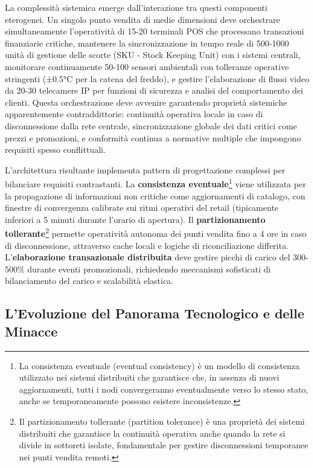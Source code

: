 La complessità sistemica emerge dall'interazione tra questi componenti eterogenei. Un singolo punto vendita di medie dimensioni deve orchestrare simultaneamente l'operatività di 15-20 terminali POS che processano transazioni finanziarie critiche, mantenere la sincronizzazione in tempo reale di 500-1000 unità di gestione delle scorte (SKU - Stock Keeping Unit) con i sistemi centrali, monitorare continuamente 50-100 sensori ambientali con tolleranze operative stringenti (±0.5°C per la catena del freddo), e gestire l'elaborazione di flussi video da 20-30 telecamere IP per funzioni di sicurezza e analisi del comportamento dei clienti. Questa orchestrazione deve avvenire garantendo proprietà sistemiche apparentemente contraddittorie: continuità operativa locale in caso di disconnessione dalla rete centrale, sincronizzazione globale dei dati critici come prezzi e promozioni, e conformità continua a normative multiple che impongono requisiti spesso conflittuali.

L'architettura risultante implementa pattern di progettazione complessi per bilanciare requisiti contrastanti. La \textbf{consistenza eventuale}\footnote{La consistenza eventuale (eventual consistency) è un modello di consistenza utilizzato nei sistemi distribuiti che garantisce che, in assenza di nuovi aggiornamenti, tutti i nodi convergeranno eventualmente verso lo stesso stato, anche se temporaneamente possono esistere inconsistenze.} viene utilizzata per la propagazione di informazioni non critiche come aggiornamenti di catalogo, con finestre di convergenza calibrate sui ritmi operativi del retail (tipicamente inferiori a 5 minuti durante l'orario di apertura). Il \textbf{partizionamento tollerante}\footnote{Il partizionamento tollerante (partition tolerance) è una proprietà dei sistemi distribuiti che garantisce la continuità operativa anche quando la rete si divide in sottoreti isolate, fondamentale per gestire disconnessioni temporanee nei punti vendita remoti.} permette operatività autonoma dei punti vendita fino a 4 ore in caso di disconnessione, attraverso cache locali e logiche di riconciliazione differita. L'\textbf{elaborazione transazionale distribuita} deve gestire picchi di carico del 300-500\% durante eventi promozionali\autocite{Osservatorio2024}, richiedendo meccanismi sofisticati di bilanciamento del carico e scalabilità elastica.

\subsection{L'Evoluzione del Panorama Tecnologico e delle Minacce}


